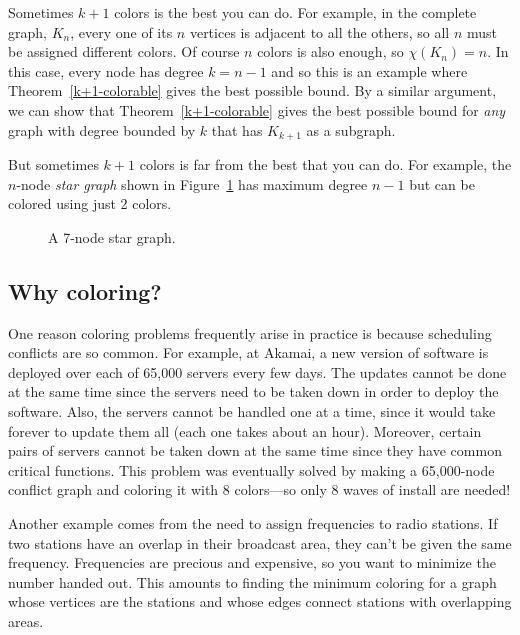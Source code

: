 Sometimes $k+1$ colors is the best you can do.  For example, in the
complete graph, $K_n$, every one of its $n$ vertices is adjacent to
all the others, so all $n$ must be assigned different colors.  Of
course $n$ colors is also enough, so $\chi(K_n)=n$.  In this case,
every node has degree $k = n - 1$ and so this is an example where
Theorem~\ref{k+1-colorable} gives the best possible bound.  By a
similar argument, we can show that Theorem~\ref{k+1-colorable} gives
the best possible bound for \emph{any} graph with degree bounded by
$k$ that has $K_{k+1}$ as a subgraph.

But sometimes $k+1$ colors is far from the best that you can do.
For example, the $n$-node \emph{star graph} shown in
Figure~\ref{fig:5T} has maximum degree $n - 1$ but can be colored
using just 2 colors.

\begin{figure}


\caption{A 7-node star graph.}

\label{fig:5T}

\end{figure}


\subsection{Why coloring?}

One reason coloring problems frequently arise in practice is because
scheduling conflicts are so common.  For example, at Akamai, a new
version of software is deployed over each of 65,000 servers every few
days.  The updates cannot be done at the same time since the servers
need to be taken down in order to deploy the software.  Also, the
servers cannot be handled one at a time, since it would take forever
to update them all (each one takes about an hour).  Moreover, certain
pairs of servers cannot be taken down at the same time since they have
common critical functions.  This problem was eventually solved by
making a 65,000-node conflict graph and coloring it with 8 colors---so
only 8 waves of install are needed!

Another example comes from the need to assign frequencies to radio
stations.  If two stations have an overlap in their broadcast area, they
can't be given the same frequency.  Frequencies are precious and
expensive, so you want to minimize the number handed out.  This amounts to
finding the minimum coloring for a graph whose vertices are the stations
and whose edges connect stations with overlapping areas.

